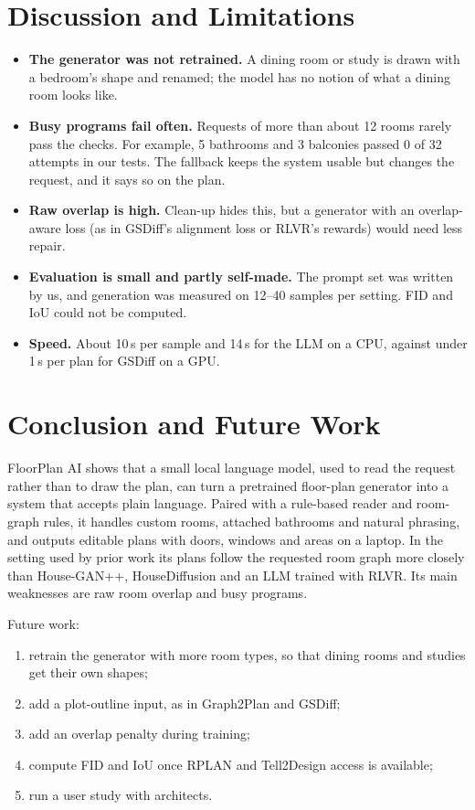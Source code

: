 \documentclass[11pt,a4paper]{article}
\begin{document}
\section{Discussion and Limitations}
\begin{itemize}
  \item \textbf{The generator was not retrained.} A dining room or study is drawn
        with a bedroom's shape and renamed; the model has no notion of what a
        dining room looks like.
  \item \textbf{Busy programs fail often.} Requests of more than about 12 rooms
        rarely pass the checks. For example, 5 bathrooms and 3 balconies passed
        0 of 32 attempts in our tests. The fallback keeps the system usable but
        changes the request, and it says so on the plan.
  \item \textbf{Raw overlap is high.} Clean-up hides this, but a generator with an
        overlap-aware loss (as in GSDiff's alignment loss or RLVR's rewards) would
        need less repair.
  \item \textbf{Evaluation is small and partly self-made.} The prompt set was
        written by us, and generation was measured on 12--40 samples per setting.
        FID and IoU could not be computed.
  \item \textbf{Speed.} About 10\,s per sample and 14\,s for the LLM on a CPU,
        against under 1\,s per plan for GSDiff on a GPU.
\end{itemize}

\section{Conclusion and Future Work}
FloorPlan AI shows that a small local language model, used to read the request
rather than to draw the plan, can turn a pretrained floor-plan generator into a
system that accepts plain language. Paired with a rule-based reader and
room-graph rules, it handles custom rooms, attached bathrooms and natural
phrasing, and outputs editable plans with doors, windows and areas on a laptop.
In the setting used by prior work its plans follow the requested room graph more
closely than House-GAN++, HouseDiffusion and an LLM trained with RLVR. Its main
weaknesses are raw room overlap and busy programs.

Future work:
\begin{enumerate}
  \item retrain the generator with more room types, so that dining rooms and
        studies get their own shapes;
  \item add a plot-outline input, as in Graph2Plan and GSDiff;
  \item add an overlap penalty during training;
  \item compute FID and IoU once RPLAN and Tell2Design access is available;
  \item run a user study with architects.
\end{enumerate}
\end{document}
